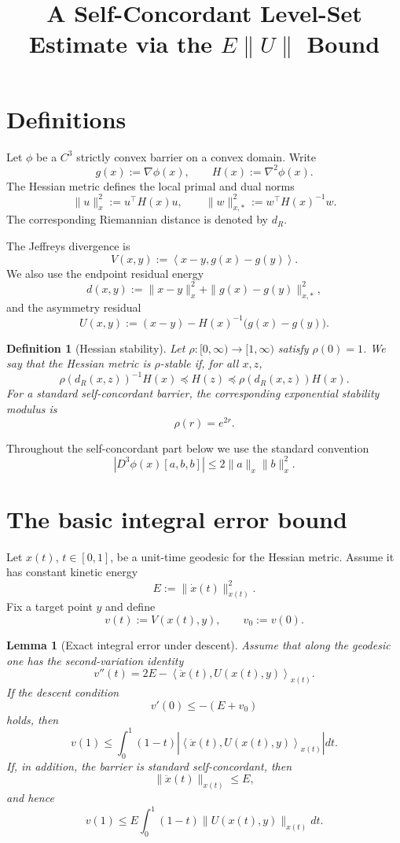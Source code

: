 \documentclass[11pt]{article}
\title{A Self-Concordant Level-Set Estimate via the $E\|U\|$ Bound}
\author{}
\date{}
\newtheorem{definition}{Definition}
\newtheorem{lemma}{Lemma}
\newcommand{\ip}[2]{\left\langle #1,#2\right\rangle}
\begin{document}
\maketitle

\section{Definitions}

Let $\phi$ be a $C^3$ strictly convex barrier on a convex domain. Write
\[
    g(x):=\nabla \phi(x),
    \qquad
    H(x):=\nabla^2\phi(x).
\]
The Hessian metric defines the local primal and dual norms
\[
    \|u\|_x^2:=u^\top H(x)u,
    \qquad
    \|w\|_{x,*}^2:=w^\top H(x)^{-1}w.
\]
The corresponding Riemannian distance is denoted by $d_R$.

The Jeffreys divergence is
\[
    V(x,y):=\ip{x-y}{g(x)-g(y)}.
\]
We also use the endpoint residual energy
\[
    d(x,y):=\|x-y\|_x^2+\|g(x)-g(y)\|_{x,*}^2,
\]
and the asymmetry residual
\[
    U(x,y):=(x-y)-H(x)^{-1}\bigl(g(x)-g(y)\bigr).
\]

\begin{definition}[Hessian stability]
Let $\rho:[0,\infty)\to[1,\infty)$ satisfy $\rho(0)=1$. We say that the Hessian metric is $\rho$-stable if, for all $x,z$,
\[
    \rho(d_R(x,z))^{-1}H(x)
    \preceq H(z)
    \preceq \rho(d_R(x,z))H(x).
\]
For a standard self-concordant barrier, the corresponding exponential stability modulus is
\[
    \rho(r)=e^{2r}.
\]
\end{definition}

Throughout the self-concordant part below we use the standard convention
\[
    |D^3\phi(x)[a,b,b]|
    \le
    2\|a\|_x\|b\|_x^2.
\]

\section{The basic integral error bound}

Let $x(t)$, $t\in[0,1]$, be a unit-time geodesic for the Hessian metric. Assume it has constant kinetic energy
\[
    E:=\|\dot x(t)\|_{x(t)}^2.
\]
Fix a target point $y$ and define
\[
    v(t):=V(x(t),y),
    \qquad
    v_0:=v(0).
\]

\begin{lemma}[Exact integral error under descent]
Assume that along the geodesic one has the second-variation identity
\[
    v''(t)
    =
    2E-\ip{\ddot x(t)}{U(x(t),y)}_{x(t)}.
\]
If the descent condition
\[
    v'(0)\le -(E+v_0)
\]
holds, then
\[
    v(1)
    \le
    \int_0^1(1-t)
    \left|
    \ip{\ddot x(t)}{U(x(t),y)}_{x(t)}
    \right|dt.
\]
If, in addition, the barrier is standard self-concordant, then
\[
    \|\ddot x(t)\|_{x(t)}\le E,
\]
and hence
\[
    v(1)
    \le
    E\int_0^1(1-t)\|U(x(t),y)\|_{x(t)}dt.
\]
\end{lemma}
\end{document}
